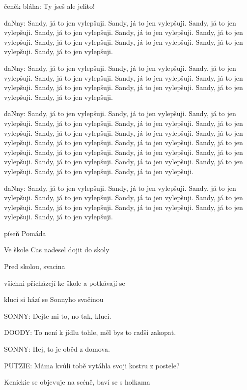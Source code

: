 \rep čeněk bláha: Ty jseš ale jelito!

\rep daNny: Sandy, já to jen vylepšuji. Sandy, já to jen vylepšuji. Sandy, já to jen vylepšuji. Sandy, já to jen vylepšuji. Sandy, já to jen vylepšuji. Sandy, já to jen vylepšuji. Sandy, já to jen vylepšuji. Sandy, já to jen vylepšuji. Sandy, já to jen vylepšuji. Sandy, já to jen vylepšuji. 


\rep daNny: Sandy, já to jen vylepšuji. Sandy, já to jen vylepšuji. Sandy, já to jen vylepšuji. Sandy, já to jen vylepšuji. Sandy, já to jen vylepšuji. Sandy, já to jen vylepšuji. Sandy, já to jen vylepšuji. Sandy, já to jen vylepšuji. Sandy, já to jen vylepšuji. Sandy, já to jen vylepšuji. 

\rep daNny: Sandy, já to jen vylepšuji. Sandy, já to jen vylepšuji. Sandy, já to jen vylepšuji. Sandy, já to jen vylepšuji. Sandy, já to jen vylepšuji. Sandy, já to jen vylepšuji. Sandy, já to jen vylepšuji. Sandy, já to jen vylepšuji. Sandy, já to jen vylepšuji. Sandy, já to jen vylepšuji. 
Sandy, já to jen vylepšuji. Sandy, já to jen vylepšuji. Sandy, já to jen vylepšuji. Sandy, já to jen vylepšuji. Sandy, já to jen vylepšuji.
Sandy, já to jen vylepšuji. Sandy, já to jen vylepšuji. Sandy, já to jen vylepšuji. Sandy, já to jen vylepšuji. Sandy, já to jen vylepšuji.

\rep daNny: Sandy, já to jen vylepšuji. Sandy, já to jen vylepšuji. Sandy, já to jen vylepšuji. Sandy, já to jen vylepšuji. Sandy, já to jen vylepšuji. Sandy, já to jen vylepšuji. Sandy, já to jen vylepšuji. Sandy, já to jen vylepšuji. Sandy, já to jen vylepšuji. Sandy, já to jen vylepšuji. 

\pop píseň Pomáda

\act Ve škole
Cas nadesel dojit do skoly

\scene Pred skolou, svacina

\pop všichni přicházejí ke škole a potkávají se

\pop kluci si hází se Sonnyho svačinou

\rep SONNY:        Dejte mi to, no tak, kluci.

\rep DOODY:        To není k jídlu tohle, měl bys to radši zakopat.

\rep SONNY:        Hej, to je oběd z domova.

\rep PUTZIE:        Máma kvůli tobě vytáhla svoji kostru z postele?

\pop Kenickie se objevuje na scéně, baví se s holkama

